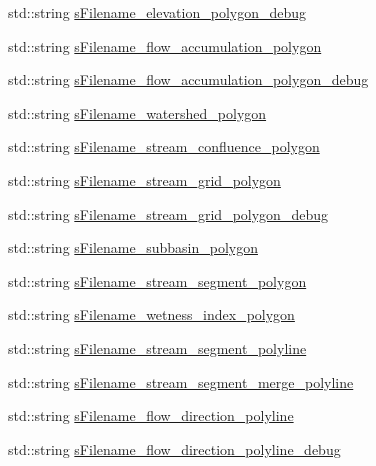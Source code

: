 \begin{DoxyCompactItemize}
std\-::string \hyperlink{classhexwatershed_1_1domain_aab217d0d54135663b80f65ab416a294a}{s\-Filename\-\_\-elevation\-\_\-polygon\-\_\-debug}
\item 
std\-::string \hyperlink{classhexwatershed_1_1domain_ab5b6a7a63ac54ffe127704b804fbf902}{s\-Filename\-\_\-flow\-\_\-accumulation\-\_\-polygon}
\item 
std\-::string \hyperlink{classhexwatershed_1_1domain_aad07742f02d46cc27f749e88c4d8198f}{s\-Filename\-\_\-flow\-\_\-accumulation\-\_\-polygon\-\_\-debug}
\item 
std\-::string \hyperlink{classhexwatershed_1_1domain_a1485608eea9c7f5cca53ee07cdb21b99}{s\-Filename\-\_\-watershed\-\_\-polygon}
\item 
std\-::string \hyperlink{classhexwatershed_1_1domain_a0336019c551b96cb417539db336c9491}{s\-Filename\-\_\-stream\-\_\-confluence\-\_\-polygon}
\item 
std\-::string \hyperlink{classhexwatershed_1_1domain_a3bd210d0b5641b0f1c802bc30a2da523}{s\-Filename\-\_\-stream\-\_\-grid\-\_\-polygon}
\item 
std\-::string \hyperlink{classhexwatershed_1_1domain_a37139f277cdc2d45bd86a3925828f46b}{s\-Filename\-\_\-stream\-\_\-grid\-\_\-polygon\-\_\-debug}
\item 
std\-::string \hyperlink{classhexwatershed_1_1domain_a2c268f965da15520aed905681bc26a3c}{s\-Filename\-\_\-subbasin\-\_\-polygon}
\item 
std\-::string \hyperlink{classhexwatershed_1_1domain_afdd8ae066d65ca7e0fdd364f331086b6}{s\-Filename\-\_\-stream\-\_\-segment\-\_\-polygon}
\item 
std\-::string \hyperlink{classhexwatershed_1_1domain_a5ee33e54da314c49081cc5aff85ed2f2}{s\-Filename\-\_\-wetness\-\_\-index\-\_\-polygon}
\item 
std\-::string \hyperlink{classhexwatershed_1_1domain_a9c0a520ad75fcd98931a2b2a0de6bbba}{s\-Filename\-\_\-stream\-\_\-segment\-\_\-polyline}
\item 
std\-::string \hyperlink{classhexwatershed_1_1domain_a8fbb658626050e4041a6f055f5db9e50}{s\-Filename\-\_\-stream\-\_\-segment\-\_\-merge\-\_\-polyline}
\item 
std\-::string \hyperlink{classhexwatershed_1_1domain_a6c6d9ac39299a220605efcf4b6092103}{s\-Filename\-\_\-flow\-\_\-direction\-\_\-polyline}
\item 
std\-::string \hyperlink{classhexwatershed_1_1domain_a6d9997df868bf85104cb2dacc3b0a074}{s\-Filename\-\_\-flow\-\_\-direction\-\_\-polyline\-\_\-debug}
\item 

\end{DoxyCompactItemize}
